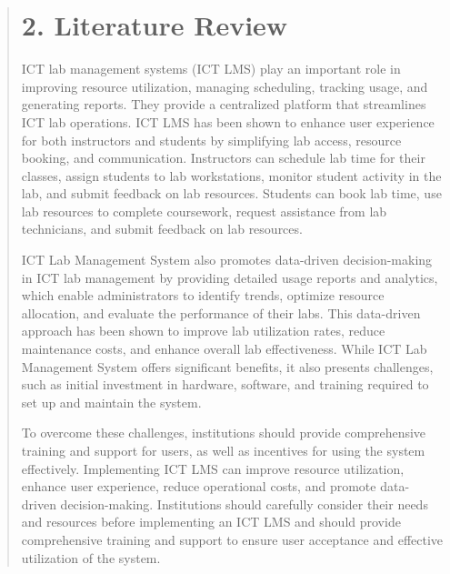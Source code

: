 \documentclass[12pt]{report}
\begin{document}
	\begin{quote}
		\section{2. Literature Review}
		\hspace{1cm}ICT lab management systems (ICT LMS) play an important role in improving resource utilization, managing scheduling, tracking usage, and generating reports. They provide a centralized platform that streamlines ICT lab operations. ICT LMS has been shown to enhance user experience for both instructors and students by simplifying lab access, resource booking, and communication. Instructors can schedule lab time for their classes, assign students to lab workstations, monitor student activity in the lab, and submit feedback on lab resources. Students can book lab time, use lab resources to complete coursework, request assistance from lab technicians, and submit feedback on lab resources.
		
		\hspace{1cm}ICT Lab Management System also promotes data-driven decision-making in ICT lab management by providing detailed usage reports and analytics, which enable administrators to identify trends, optimize resource allocation, and evaluate the performance of their labs. This data-driven approach has been shown to improve lab utilization rates, reduce maintenance costs, and enhance overall lab effectiveness. While ICT Lab Management System offers significant benefits, it also presents challenges, such as initial investment in hardware, software, and training required to set up and maintain the system.
		
		\hspace{1cm}To overcome these challenges, institutions should provide comprehensive training and support for users, as well as incentives for using the system effectively. Implementing ICT LMS can improve resource utilization, enhance user experience, reduce operational costs, and promote data-driven decision-making. Institutions should carefully consider their needs and resources before implementing an ICT LMS and should provide comprehensive training and support to ensure user acceptance and effective utilization of the system.
	\end{quote}
	\clearpage
	
\end{document}
